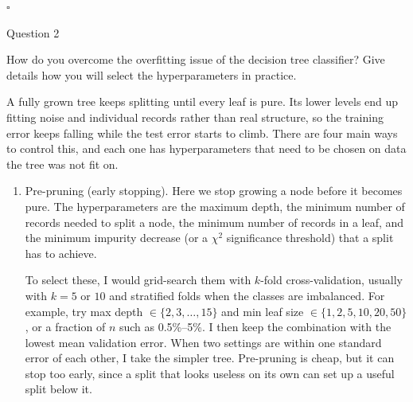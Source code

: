 \documentclass[12pt,letterpaper, onecolumn]{exam}
\begin{document}
\begin{questions}
\begin{solution}
        $\square$
    \end{solution}

    \newpage
    \question[10] Question 2\droppoints

    How do you overcome the overfitting issue of the decision tree classifier? Give details how you will select the hyperparameters in practice.

    \begin{solution}

        A fully grown tree keeps splitting until every leaf is pure. Its lower levels end up fitting noise and individual records rather than real structure, so the training error keeps falling while the test error starts to climb. There are four main ways to control this, and each one has hyperparameters that need to be chosen on data the tree was not fit on.

        \begin{enumerate}[1.)]
            \item Pre-pruning (early stopping). Here we stop growing a node before it becomes pure. The hyperparameters are the maximum depth, the minimum number of records needed to split a node, the minimum number of records in a leaf, and the minimum impurity decrease (or a $\chi^2$ significance threshold) that a split has to achieve.

            To select these, I would grid-search them with $k$-fold cross-validation, usually with $k=5$ or $10$ and stratified folds when the classes are imbalanced. For example, try max depth $\in\{2,3,\dots,15\}$ and min leaf size $\in\{1,2,5,10,20,50\}$, or a fraction of $n$ such as 0.5\%--5\%. I then keep the combination with the lowest mean validation error. When two settings are within one standard error of each other, I take the simpler tree. Pre-pruning is cheap, but it can stop too early, since a split that looks useless on its own can set up a useful split below it.


\end{enumerate}
\end{solution}
\end{questions}
\end{document}

